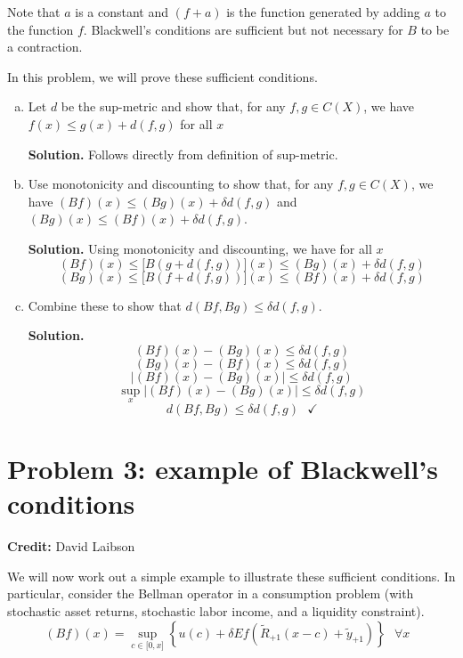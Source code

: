 \documentclass[11pt]{extarticle}
\theoremstyle{plain}
\theoremstyle{definition}
\begin{document}
\noindent
Note that $a$ is a constant and $(f+a)$ is the function generated by adding $a$ to the function $f$. Blackwell's conditions are sufficient but not necessary for $B$ to be a contraction.

\vspace{10mm}
\noindent
In this problem, we will prove these sufficient conditions.
\begin{enumerate}[(a)]
\item Let $d$ be the sup-metric and show that, for any $f, g \in C(X)$, we have $f(x) \leq g(x) + d(f, g)$ for all $x$

\textbf{Solution.} Follows directly from definition of sup-metric.

\item Use monotonicity and discounting to show that, for any $f, g \in C(X)$, we have $(Bf)(x) \leq (Bg)(x) + \delta d(f, g)$ and $(Bg)(x) \leq (Bf)(x) + \delta d(f, g)$. 

\textbf{Solution.} Using monotonicity and discounting, we have for all $x$
\[
\left( Bf\right) (x)\leq \lbrack B(g+d(f,g))](x)\leq \left( Bg\right)
(x)+\delta d(f,g) 
\]
\[
\left( Bg\right) (x)\leq \lbrack B(f+d(f,g))](x)\leq \left( Bf\right) \left(
x\right) +\delta d(f,g) 
\]

\item Combine these to show that $d(Bf, Bg) \leq \delta d(f, g)$. 

\textbf{Solution.}
\[
\left( Bf\right) \left( x\right) -\left( Bg\right) \left( x\right) \leq
\delta d(f,g) 
\]%
\[
\left( Bg\right) \left( x\right) -\left( Bf\right) \left( x\right) \leq
\delta d(f,g) 
\]%
\[
\left\vert (Bf)(x)-(Bg)(x)\right\vert \leq \delta d(f,g) 
\]%
\[
\sup_{x}\left\vert (Bf)(x)-(Bg)(x)\right\vert \leq \delta d(f,g) 
\]%
\[
d(Bf,Bg)\leq \delta d(f,g)\text{ \ \ \ }\checkmark 
\]%
\end{enumerate}



\vspace{10mm}
\section*{Problem 3: example of Blackwell's conditions}

\textbf{Credit:} David Laibson

\vspace{5mm}
\noindent
We will now work out a simple example to illustrate these sufficient conditions. In particular, consider the Bellman operator in a consumption problem (with stochastic asset returns, stochastic labor income, and a liquidity constraint). 
\begin{equation*}
	(Bf)(x)=\sup_{c\in \lbrack 0,x]}\left\{ u(c)+\delta Ef(\tilde{R}_{+1}(x-c)+%
	\tilde{y}_{+1})\right\} \text{ \ }\forall x\text{\ } 
\end{equation*}
\end{document}
